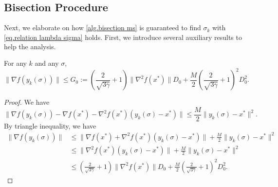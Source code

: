 \documentclass{article}
\begin{document}
\subsection{Bisection Procedure}
Next, we elaborate on how \autoref{alg.bisection ms} is guaranteed to find $\sigma_k$ with \eqref{eq.relation lambda sigma} holds. First, we introduce several auxiliary results to help the analysis.
\begin{corollary}
    \label{coro.boundedness ysigma}
    For any $k$ and any $\sigma$, 
    \begin{equation}
        \label{eq.ub yk sigma}
        \|\nabla f(y_k(\sigma))\| \leq G_0:= \left(\frac{2}{\sqrt{3\gamma}}+1\right)\|\nabla ^2 f(x^*)\|D_0+\frac{M}{2}\left(\frac{2}{\sqrt{3\gamma}}+1\right)^2 D_0^2.
    \end{equation}
\end{corollary}
\begin{proof}
    We have
    \begin{equation*}
            \|\nabla f(y_k(\sigma)) - \nabla f(x^*) -\nabla^2 f(x^*)(y_k(\sigma)-x^*)\| \leq \frac{M}{2}\|y_k(\sigma)-x^*\|^2.
    \end{equation*}
    By triangle inequality, we have
    \begin{equation*}
        \begin{aligned}
            \|\nabla f(y_k(\sigma)) \| &\leq \|\nabla f(x^*)+\nabla^2 f(x^*)(y_k(\sigma)-x^*)\| +\frac{M}{2}\|y_k(\sigma)-x^*\|^2\\
            &\leq \|\nabla^2 f(x^*)(y_k(\sigma)-x^*)\|+\frac{M}{2}\|y_k(\sigma)-x^*\|^2\\
            &\leq \left(\frac{2}{\sqrt{3\gamma}}+1\right)\|\nabla ^2 f(x^*)\|D_0+\frac{M}{2}\left(\frac{2}{\sqrt{3\gamma}}+1\right)^2 D_0^2.
        \end{aligned}
    \end{equation*}
\end{proof}
\end{document}
